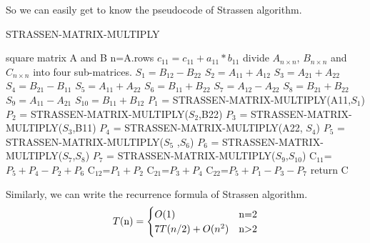 \documentclass[journal]{IEEEtran}
\begin{document}
So we can easily get to know the pseudocode of Strassen algorithm.
\begin{algorithm}[htb]  
  \caption{STRASSEN-MATRIX-MULTIPLY}  
   
  \begin{algorithmic}  
    \Require  
    square matrix A and B 
    \State n=A.rows
    \State  $c_{11}=c_{11}+a_{11}*b_{11}$
    \Else
    \State divide $A_{n\times n}$, $B_{n\times n}$ and  $C_{n\times n}$  into four sub-matrices.
    \State $S_1=B_{12}-B_{22}$
    \State $S_2=A_{11}+A_{12}$
    \State$S_3=A_{21}+A_{22}$
    \State$S_4=B_{21}-B_{11}$
    \State$S_5=A_{11}+A_{22}$
    \State$S_6=B_{11}+B_{22}$
    \State$S_7=A_{12}-A_{22}$
    \State$S_8=B_{21}+B_{22}$
    \State$S_9=A_{11}-A_{21}$
    \State$S_{10}=B_{11}+B_{12}$
    \State $P_1$ = STRASSEN-MATRIX-MULTIPLY(A11,$S_1$)
    \State $P_2$ = STRASSEN-MATRIX-MULTIPLY($S_2$,B22)
    \State $P_3$ = STRASSEN-MATRIX-MULTIPLY($S_3$,B11)
    \State $P_4$ = STRASSEN-MATRIX-MULTIPLY(A22, $S_4$)
    \State $P_5$ = STRASSEN-MATRIX-MULTIPLY($S_5$ ,$S_6$)
    \State $P_6$ = STRASSEN-MATRIX-MULTIPLY($S_7$,$S_8$)
    \State $P_7$ = STRASSEN-MATRIX-MULTIPLY($S_9$,$S_{10}$)
    \State C$_{11}$=$P_5+P_4-P_2+P_6$
    \State C$_{12}$=$P_1+P_2$
    \State C$_{21}$=$P_3+P_4$
    \State C$_{22}$=$P_5+P_1-P_3-P_7$
    \State return C
    \EndIf

  \end{algorithmic}  
\end{algorithm}




Similarly, we can write the recurrence formula of Strassen algorithm.
\begin{align}
  T(\mathrm{n})=
  \begin{cases}
    O(1)& \text{n=2}\\
    7T(n/2)+O(n^2)& \text{n\textgreater 2}
    \end{cases}
\end{align}
\end{document}

